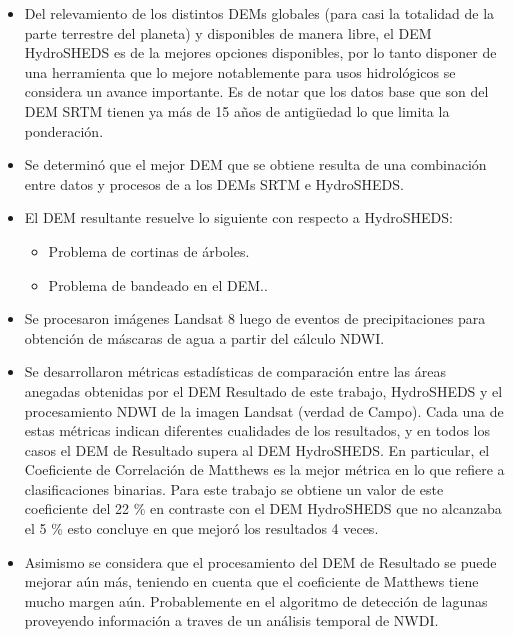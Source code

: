 \documentclass[10pt,a4paper, twoside]{report}
\begin{document}
\begin{itemize}

		\item Del relevamiento de los distintos DEMs globales (para casi la totalidad de la parte terrestre del planeta) y disponibles de manera libre, el DEM HydroSHEDS es de la mejores opciones disponibles, por lo tanto disponer de una herramienta que lo mejore notablemente para usos hidrológicos se considera un avance importante. Es de notar que los datos base que son del DEM SRTM tienen ya más de 15 años de antigüedad lo que limita la ponderación.

	\item Se determinó que el mejor DEM que se obtiene resulta de una combinación entre datos y procesos de a los DEMs SRTM e HydroSHEDS.

	
	\item El DEM resultante resuelve lo siguiente con respecto a HydroSHEDS:	
		\begin{itemize}
			\item Problema de cortinas de árboles.
			\item Problema de bandeado en el DEM..
		\end{itemize}		
	
		\item Se procesaron imágenes Landsat 8 luego de eventos de precipitaciones para obtención de máscaras de agua a partir del cálculo NDWI.
	
			\item Se desarrollaron métricas estadísticas de comparación entre las áreas anegadas obtenidas por el DEM Resultado de este trabajo, HydroSHEDS y el procesamiento NDWI de la imagen Landsat (verdad de Campo). Cada una de estas métricas indican diferentes cualidades de los resultados, y en todos los casos el DEM de Resultado supera al DEM HydroSHEDS. En particular, el Coeficiente de Correlación de Matthews es la mejor métrica en lo que refiere a clasificaciones binarias. Para este trabajo se obtiene un valor de este coeficiente del 22 \% en contraste con el DEM HydroSHEDS que no alcanzaba el 5 \% esto concluye en que mejoró los resultados 4 veces. 			
			\item Asimismo se considera que el procesamiento del DEM de Resultado se puede mejorar aún más, teniendo en cuenta que el coeficiente de Matthews tiene mucho margen aún. Probablemente en el algoritmo de detección de lagunas proveyendo información a traves de un análisis temporal de NWDI.


\end{itemize}
\end{document}
